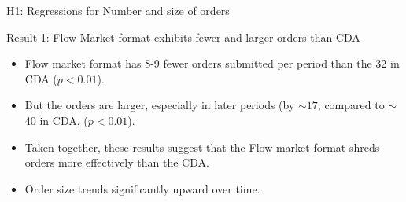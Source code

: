 \documentclass[10pt]{beamer}
\begin{document}
\begin{frame}{H1: Regressions for Number and size of orders}
\begin{table}[H]
\centering    
\label{tab:TradersBehavior}
\end{table}
\end{frame}


\begin{frame}{Result 1: Flow Market format exhibits fewer and larger orders than CDA}
\begin{itemize}
\item Flow market format has 8-9 fewer orders submitted per period than the 32 in CDA ($p < 0.01$).
\item But the orders are larger, especially in later periods (by $\sim 17$, compared to $\sim$40 in CDA, ($p < 0.01$).  
\item Taken together, these results suggest that the Flow market format shreds orders more effectively than the CDA. 
\item Order size trends significantly upward over time.
\end{itemize}   
\end{frame}
\end{document}
